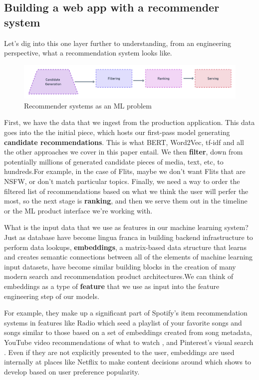 \documentclass[draft, 11pt]{diazessay} %
\begin{document}
\subsection{Building a web app with a recommender system}

Let's dig into this one layer further to understanding, from an engineering perspective, what a recommendation system looks like. 

\begin{figure}[!ht]
\centering
\includegraphics[width=\textwidth]{figures/recsys.png}
\caption{Recommender systems as an ML problem}
\end{figure}

First, we have the data that we ingest from the production application. This data goes into the the initial piece, which hosts our first-pass model generating \textbf{candidate recommendations}. This is what BERT, Word2Vec, tf-idf and all the other approaches we cover in this paper entail. We then \textbf{filter}, down from potentially millions of generated candidate pieces of media, text, etc, to hundreds.For example, in the case of Flits, maybe we don't want Flits that are NSFW, or don't match particular topics.  Finally, we need a way to order the filtered list of recommendations based on what we think the user will perfer the most, so the next stage is \textbf{ranking}, and then we serve them out in the timeline or the ML product interface we're working with. 

What is the input data that we use as features in our machine learning system? Just as database have become lingua franca in building backend infrastructure to perform data lookups, \textbf{embeddings}, a matrix-based data structure that learns and creates semantic connections between all of the elements of machine learning input datasets, have become similar building blocks in the creation of many modern search and recommendation product architectures.We can think of embeddings as a type of \textbf{feature} that we use as input into the feature engineering step of our models.  

For example, they make up a significant part of Spotify's item recommendation systems \citep{hansen2020contextual} in features like Radio which seed a playlist of your favorite songs and songs similar to those based on a set of embeddings created from song metadata, YouTube video recommendations of what to watch \citep{covington2016deep} , and Pinterest's visual search \citep{jing2015visual}. Even if they are not explicitly presented to the user, embeddings are used internally at places like Netflix to make content decisions around which shows to develop based on user preference popularity. 
\end{document}
